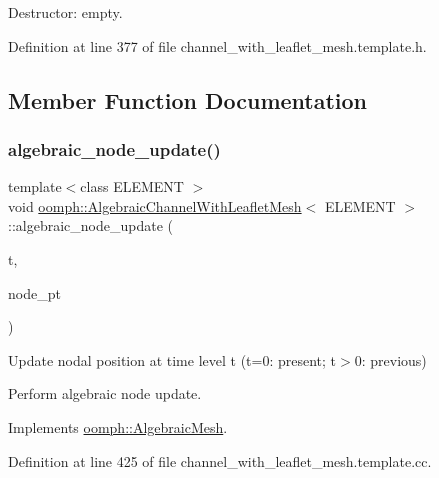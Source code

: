 Destructor\+: empty. 



Definition at line 377 of file channel\+\_\+with\+\_\+leaflet\+\_\+mesh.\+template.\+h.



\subsection{Member Function Documentation}
\mbox{\label{classoomph_1_1AlgebraicChannelWithLeafletMesh_a4c01b99ca83286f872c517fc5269a890}} 
\subsubsection{\texorpdfstring{algebraic\+\_\+node\+\_\+update()}{algebraic\_node\_update()}}
{\footnotesize\ttfamily template$<$class E\+L\+E\+M\+E\+NT $>$ \\
void \hyperlink{classoomph_1_1AlgebraicChannelWithLeafletMesh}{oomph\+::\+Algebraic\+Channel\+With\+Leaflet\+Mesh}$<$ E\+L\+E\+M\+E\+NT $>$\+::algebraic\+\_\+node\+\_\+update (\begin{DoxyParamCaption}\item[{const unsigned \&}]{t,  }\item[{\hyperlink{classoomph_1_1AlgebraicNode}{Algebraic\+Node} $\ast$\&}]{node\+\_\+pt }\end{DoxyParamCaption})\hspace{0.3cm}{\ttfamily [virtual]}}



Update nodal position at time level t (t=0\+: present; t$>$0\+: previous) 

Perform algebraic node update. 

Implements \hyperlink{classoomph_1_1AlgebraicMesh_ab01d6f93354f3c4e5c9d1f0a5885a65b}{oomph\+::\+Algebraic\+Mesh}.



Definition at line 425 of file channel\+\_\+with\+\_\+leaflet\+\_\+mesh.\+template.\+cc.



